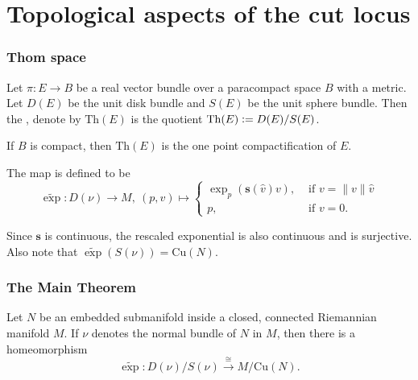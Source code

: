 \documentclass{beamer}
\begin{document}
	\section{Topological aspects of the cut locus}
	\begin{frame}
		\frametitle<presentation>{Thom space}
		 
		 \p
		 \begin{definition}
		 	Let  $\pi: E\to B$ be a real vector bundle over a paracompact space $B$ with a metric. Let $D(E)$ be the unit disk bundle and $S(E)$ be the unit sphere bundle. \p Then the \emph{}, denote by $\mathrm{Th}(E)$ is the quotient $\mathrm{Th}(E) \vcentcolon= D(E)/S(E)$.
		 \end{definition}

		 \p
		 \begin{remark}
		 	If $B$ is compact, then $\mathrm{Th}(E)$ is the one point compactification of $E$. 
		 \end{remark}
	\end{frame}	


	\begin{frame}
		\begin{definition}
			The \emph{} map is defined to be 
			\begin{displaymath}
				\widetilde{\exp}:D(\nu)\to M,~ (p,v)\mapsto \begin{cases}
					\exp_p(\mathbf{s}(\hat{v})v), &\text{ if } v = \|v\|\hat{v}\\
					p, & \text{ if } v=0.
				\end{cases}
			\end{displaymath}
		\end{definition}

		\vspace{1.5cm}
		\p
		\begin{remark}
			Since $\mathbf{s}$ is continuous, the rescaled exponential is also continuous and is surjective. \p Also note that $\widetilde{\exp}(S(\nu)) = \mathrm{Cu}(N)$.
		\end{remark}
	\end{frame}	

	\begin{frame}
		\frametitle<presentation>{The Main Theorem}
		\begin{theorem}
			Let $N$ be an embedded submanifold inside a closed, connected Riemannian manifold $M$. If $\nu$ denotes the normal bundle of $N$ in $M$, then there is a homeomorphism 
			\begin{displaymath}
				\widetilde{\exp} : D(\nu)/S(\nu) \xrightarrow{\cong} M/\mathrm{Cu}(N).
			\end{displaymath}
		\end{theorem}
	\end{frame}	
\end{document}
